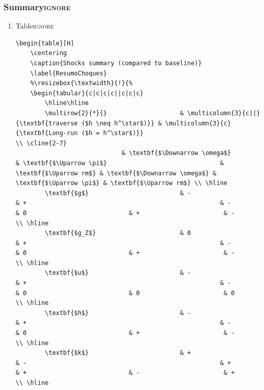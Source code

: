 \documentclass[12pt]{article}
\begin{document}
\subsubsection{Summary\hfill{}\textsc{ignore}}
\label{sec:orga8ca5e3}
\begin{enumerate}
\item Table\hfill{}\textsc{ignore}
\label{sec:org76b6ec3}
\begin{verbatim}
\begin{table}[H]
	\centering
	\caption{Shocks summary (compared to baseline)}
	\label{ResumoChoques}
	%\resizebox{\textwidth}{!}{%
	\begin{tabular}{c|c|c|c||c|c|c}
		\hline\hline
		\multirow{2}{*}{}                    & \multicolumn{3}{c||}{\textbf{traverse ($h \neq h^\star$)}} & \multicolumn{3}{c}{\textbf{Long-run ($h = h^\star$)}}                                                                                                            \\ \cline{2-7}
						     & \textbf{$\Downarrow \omega$}                               & \textbf{$\Uparrow \pi$}                               & \textbf{$\Uparrow rm$} & \textbf{$\Downarrow \omega$} & \textbf{$\Uparrow \pi$} & \textbf{$\Uparrow rm$} \\ \hline
		\textbf{$g$}                         & -                                                          & +                                                     & -                      & 0                            & +                       & -                      \\ \hline
		\textbf{$g_Z$}                       & 0                                                          & +                                                     & -                      & 0                            & +                       & -                      \\ \hline
		\textbf{$u$}                         & -                                                          & +                                                     & -                      & 0                            & 0                       & 0                      \\ \hline
		\textbf{$h$}                         & -                                                          & +                                                     & -                      & 0                            & +                       & -                      \\ \hline
		\textbf{$k$}                         & +                                                          & -                                                     & +                      & +                            & -                       & +                      \\ \hline

\end{verbatim}
\end{enumerate}
\end{document}
